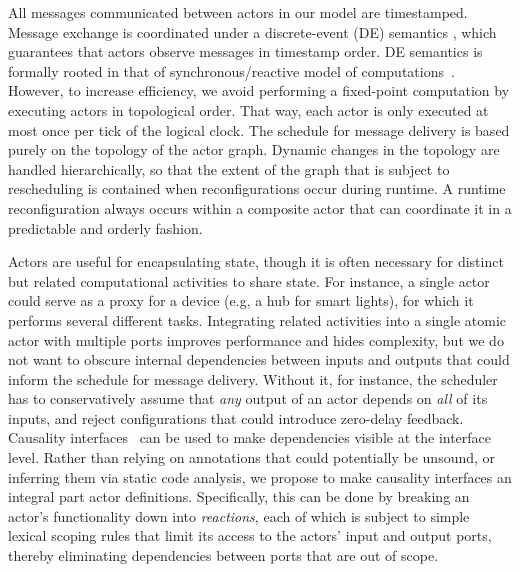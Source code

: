 \documentclass[sigconf]{acmart}
\newcommand{\marten}[1]{\mynote{Marten}{#1}{cyan}}%
\begin{document}
All messages communicated between actors in our model are timestamped. Message exchange is coordinated under a discrete-event (DE) semantics \cite{LeeEtAl:7:DiscreteEvents}, which guarantees that actors observe messages in timestamp order.
DE semantics is formally rooted in that of synchronous/reactive model of computations~\cite{LeeZheng:07:SRDECT}.
However, to increase efficiency, we avoid performing a fixed-point computation by executing actors in topological order. That way, each actor is only executed at most once per tick of the logical clock. The schedule for message delivery is based purely on the topology of the actor graph.
Dynamic changes in the topology are handled hierarchically, so that the extent of the graph that is subject to rescheduling is contained when reconfigurations occur during runtime. A runtime reconfiguration always occurs within a composite actor that can coordinate it in a predictable and orderly fashion. %

Actors are useful for encapsulating state, though it is often necessary for distinct but related computational activities to share state. For instance, a single actor could serve as a proxy for a device (e.g, a hub for smart lights), for which it performs several different tasks.
Integrating related activities into a single atomic actor with multiple ports improves performance and hides complexity, but we do not want to obscure internal dependencies between inputs and outputs that could inform the schedule for message delivery. Without it, for instance, the scheduler has to conservatively assume that \emph{any} output of an actor depends on \emph{all} of its inputs, and reject configurations that could introduce zero-delay feedback. Causality interfaces~\cite{ZhouLee:08:CausalityInterfaces} can be used to make dependencies visible at the interface level. Rather than relying on annotations that could potentially be unsound, or inferring them via static code analysis, we propose to make causality interfaces an integral part actor definitions. Specifically, this can be done by breaking an actor's functionality down into \emph{reactions}, each of which is subject to simple lexical scoping rules that limit its access to the actors' input and output ports, thereby eliminating dependencies between ports that are out of scope.
\end{document}
